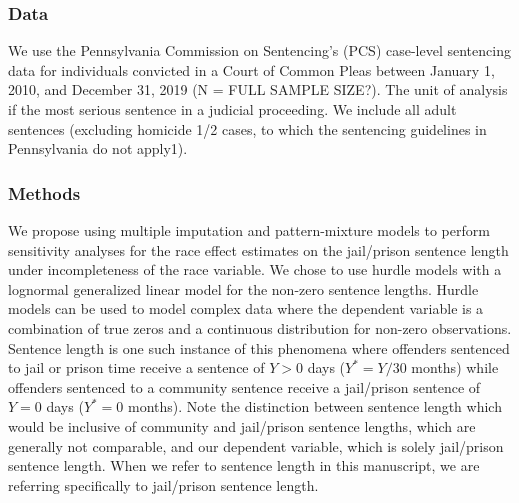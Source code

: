 \documentclass[
  letterpaper,
  DIV=11,
  numbers=noendperiod]{scrartcl}
\begin{document}
\hypertarget{data}{%
\subsubsection{Data}\label{data}}

We use the Pennsylvania Commission on Sentencing's (PCS) case-level
sentencing data for individuals convicted in a Court of Common Pleas
between January 1, 2010, and December 31, 2019 (N = FULL SAMPLE SIZE?).
The unit of analysis if the most serious sentence in a judicial
proceeding. We include all adult sentences (excluding homicide 1/2
cases, to which the sentencing guidelines in Pennsylvania do not
apply1).

\hypertarget{methods}{%
\subsubsection{Methods}\label{methods}}

We propose using multiple imputation and pattern-mixture models to
perform sensitivity analyses for the race effect estimates on the
jail/prison sentence length under incompleteness of the race variable.
We chose to use hurdle models with a lognormal generalized linear model
for the non-zero sentence lengths. Hurdle models can be used to model
complex data where the dependent variable is a combination of true zeros
and a continuous distribution for non-zero observations. Sentence length
is one such instance of this phenomena where offenders sentenced to jail
or prison time receive a sentence of \(Y > 0\) days (\(Y^* = Y/30\)
months) while offenders sentenced to a community sentence receive a
jail/prison sentence of \(Y = 0\) days (\(Y^* = 0\) months). Note the
distinction between sentence length which would be inclusive of
community and jail/prison sentence lengths, which are generally not
comparable, and our dependent variable, which is solely jail/prison
sentence length. When we refer to sentence length in this manuscript, we
are referring specifically to jail/prison sentence length.
\end{document}
